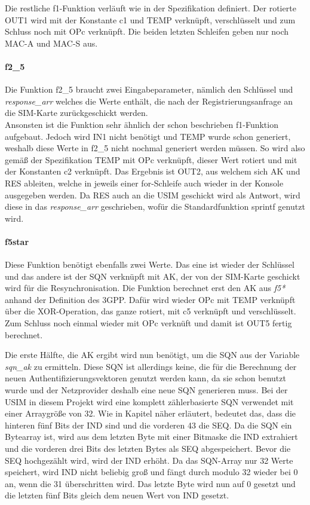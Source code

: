 		Die restliche f1-Funktion verläuft wie in der Spezifikation definiert. Der rotierte OUT1 wird mit der
		Konstante c1 und TEMP verknüpft, verschlüsselt und zum Schluss noch mit OPc verknüpft. Die beiden letzten
		Schleifen geben nur noch MAC-A und MAC-S aus.		
		
		\paragraph{f2\_5}
		Die Funktion f2\_5 braucht zwei Eingabeparameter, nämlich den Schlüssel und \emph{response\_arr} welches
		die Werte enthält, die nach der Registrierungsanfrage an die SIM-Karte zurückgeschickt werden. \\
		Ansonsten ist die Funktion sehr ähnlich der schon beschrieben f1-Funktion aufgebaut. Jedoch wird IN1
		nicht benötigt und TEMP wurde schon generiert, weshalb diese Werte in f2\_5 nicht nochmal generiert
		werden müssen. So wird also gemäß der Spezifikation TEMP mit OPc verknüpft, dieser Wert rotiert und mit
		der Konstanten c2 verknüpft. Das Ergebnis ist OUT2, aus welchem sich AK und RES ableiten, welche in jeweils
		einer for-Schleife auch wieder in der Konsole ausgegeben werden. Da RES auch an die USIM geschickt wird als
		Antwort, wird diese in das \emph{response\_arr} geschrieben, wofür die Standardfunktion sprintf genutzt wird.
		
		\paragraph{f5star}
		Diese Funktion benötigt ebenfalls zwei Werte. Das eine ist wieder der Schlüssel und das andere ist der SQN
		verknüpft mit AK, der von der SIM-Karte geschickt wird für die Resynchronisation. Die Funktion berechnet erst
		den AK aus \emph{f5*} anhand der Definition des 3GPP. Dafür wird wieder OPc mit TEMP verknüpft über die
		XOR-Operation, das ganze rotiert, mit c5 verknüpft und verschlüsselt. Zum Schluss noch einmal wieder mit
		OPc verknüft und damit ist OUT5 fertig berechnet.
		
		Die erste Hälfte, die AK ergibt wird nun benötigt, um die SQN aus der Variable \emph{sqn\_ak} zu ermitteln.
		Diese SQN ist allerdings keine, die für die Berechnung der neuen Authentifizierungsvektoren genutzt werden
		kann, da sie schon benutzt wurde und der Netzprovider deshalb eine neue SQN generieren muss. Bei der USIM
		in diesem Projekt wird eine komplett zählerbasierte SQN verwendet mit einer Arraygröße von 32.
		Wie in Kapitel  näher erläutert, bedeutet das, dass die hinteren fünf Bits der
		IND sind und die vorderen 43 die SEQ. Da die SQN ein Bytearray ist, wird aus dem letzten Byte mit einer
		Bitmaske die IND extrahiert und die vorderen drei Bits des letzten Bytes als SEQ abgespeichert. Bevor
		die SEQ hochgezählt wird, wird der IND erhöht. Da das SQN-Array nur 32 Werte speichert, wird IND nicht
		beliebig groß und fängt durch modulo 32 wieder bei 0 an, wenn die 31 überschritten wird. Das letzte Byte
		wird nun auf 0 gesetzt und die letzten fünf Bits gleich dem neuen Wert von IND gesetzt.

